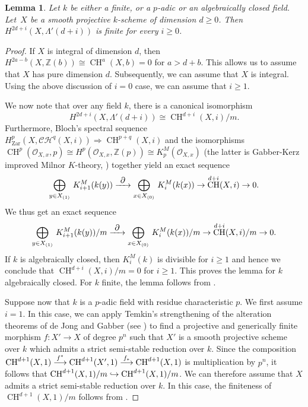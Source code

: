 \documentclass[JEP,XML,SOM,Unicode,published]{cedram}
\let\mathcal\mathscr
\def\hto{\mathrel{\lhook\joinrel\to}}
\def\To#1{\mathchoice{\xrightarrow{\textstyle\kern4pt#1\kern3pt}}{\stackrel{#1}{\longrightarrow}}{}{}}
\let\inj\hto
\newtheorem{lem}[thm]{Lemma}
\theoremstyle{definition}
\newcommand{\sC}{{\mathcal C}}
\newcommand{\sH}{{\mathcal H}}
\newcommand{\sO}{{\mathcal O}}\let\cO\sO
\newcommand{\Z}{{\mathbb Z}}
\DeclareMathOperator{\CH}{CH}
\newcommand{\zar}{\mathrm{Zar}}
\begin{document}
\begin{lem}\label{lem:smooth-proj-fin}
Let $k$ be either a finite, or a $p$-adic or an algebraically closed field.
Let~$X$ be a smooth projective $k$-scheme of dimension $d \ge 0$.
Then $H^{2d+i}(X, \Lambda'(d+i))$ is finite for every $i \ge 0$.
\end{lem}
\begin{proof}
If $X$ is integral of dimension $d$, then $H^{2a-b}(X, \Z(b)) \cong
\CH^a(X, b) = 0$ for $a > d+b$. This allows us to assume that
$X$ has pure dimension $d$. Subsequently, we can assume that $X$ is integral.
Using the above discussion of $i = 0$ case, we can assume that $i \ge 1$.

We now note that over any field $k$, there is a canonical isomorphism
\[
H^{2d+i}(X, \Lambda'(d+i)) \cong {\CH^{d+i}(X, i)}/m.
\]
Furthermore, Bloch's spectral sequence $H^p_\zar(X, {\sC}{\sH}^q(X,i))
\Rightarrow \CH^{p+q}(X,i)$ and
the isomorphisms $\CH^p(\sO_{X,x}, p) \cong
H^p(\sO_{X,x}, \Z(p)) \cong K^M_p(\sO_{X,x})$
(the latter is Gabber-Kerz improved Milnor $K$-theory, \cite{Kerz10})
together yield an exact sequence
\begin{equation}\label{eqn:smooth-proj-fin-0}
{\underset{y \in X_{(1)}}\bigoplus} \ K^M_{i+1}(k(y))
\To{\partial} {\underset{x \in X_{(0)}}\bigoplus} \ K^M_{i}(k(x))
\to \CH^{d+i}(X, i) \to 0.
\end{equation}
We thus get an exact sequence
\begin{equation}\label{eqn:smooth-proj-fin-2}
{\underset{y \in X_{(1)}}\bigoplus} \ {K^M_{i+1}(k(y))}/m
\To{\partial} {\underset{x \in X_{(0)}}\bigoplus} \ {K^M_{i}(k(x))}/m
\to {\CH^{d+i}(X, i)}/m \to 0.
\end{equation}
If $k$ is algebraically closed, then $K^M_{i}(k)$ is divisible for $i \ge 1$
and hence we conclude that ${\CH^{d+i}(X, i)}/m = 0$ for $i \ge 1$.
This proves the lemma for $k$ algebraically closed.
For $k$ finite, the lemma follows from \cite[Th.\,1.2, 1.3]{Akthar}.

Suppose now that $k$ is a $p$-adic field with residue characteristic $p$.
We first assume $i =1$. In this case, we can apply Temkin's
strengthening of the alteration theorems of de Jong and Gabber
(see \cite[Th.\,1.2.5]{Temkin}) to find a projective and generically
finite morphism $f \colon X' \to X$ of degree $p^n$ such that
$X'$ is a smooth projective scheme over $k$ which admits a strict semi-stable
reduction over $k$. Since the composition $\CH^{d+1}(X, 1)
\To{f^*} \CH^{d+1}(X', 1) \To{f_*} \CH^{d+1}(X, 1)$
is multiplication by $p^n$, it follows that
${\CH^{d+1}(X, 1)}/m \inj {\CH^{d+1}(X, 1)}/m$. We can therefore assume that
$X$ admits a strict semi-stable reduction over $k$. In this case, the
finiteness of ${\CH^{d+1}(X, 1)}/m$ follows from
\cite[Th.\,3.1.4]{Forre}.


\end{proof}
\end{document}
